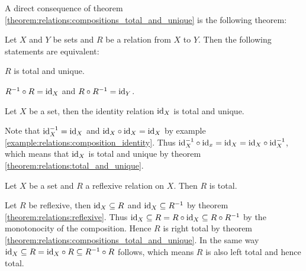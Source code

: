 A direct consequence of theorem \ref{theorem:relations:compositions_total_and_unique} is the following theorem:

\begin{theorem}\label{theorem:relations:total_and_unique}
    Let $X$ and $Y$ be sets and $R$ be a relation from $X$ to $Y$. Then the following statements are equivalent:
    \begin{intheoremenumerate}
        \item $R$ is total and unique.
        \item $R^{-1}\circ R=\text{id}_X$ and $R\circ R^{-1}=\text{id}_Y$.
    \end{intheoremenumerate}
\end{theorem}

\begin{examples}
    \begin{exampleenumerate}
        \item Let $X$ be a set, then the identity relation $\text{id}_X$ is total and unique.
        \begin{miniproof}
            Note that $\text{id}_X^{-1}=\text{id}_X$ and $\text{id}_X\circ\text{id}_X=\text{id}_X$ by example \ref{example:relations:composition_identity}. Thus $\text{id}_X^{-1}\circ\text{id}_x=\text{id}_X=\text{id}_X\circ\text{id}_X^{-1}$, which means that $\text{id}_X$ is total and unique by theorem \ref{theorem:relations:total_and_unique}.
        \end{miniproof}
        \item Let $X$ be a set and $R$ a reflexive relation on $X$. Then $R$ is total.
        \begin{miniproof}
            Let $R$ be reflexive, then $\text{id}_X\subseteq R$ and $\text{id}_X\subseteq R^{-1}$ by theorem \ref{theorem:relations:reflexive}. Thus $\text{id}_X\subseteq R=R\circ \text{id}_X\subseteq R\circ R^{-1}$ by the monotonocity of the composition. Hence $R$ is right total by theorem \ref{theorem:relations:compositions_total_and_unique}. In the same way $\text{id}_X\subseteq R=\text{id}_X\circ R\subseteq R^{-1}\circ R$ follows, which means $R$ is also left total and hence total.
        \end{miniproof}
    \end{exampleenumerate}
\end{examples}


